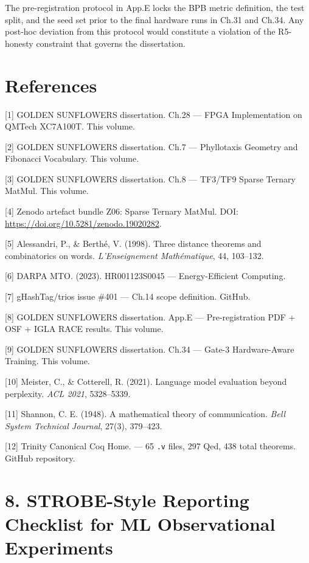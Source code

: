 The pre-registration protocol in App.E locks the
BPB metric definition, the test split, and the
seed set prior to the final hardware runs in Ch.31
and Ch.34. Any post-hoc deviation from this
protocol would constitute a violation of the
R5-honesty constraint that governs the
dissertation.

\section{References}\label{fa_14:references}

[1] GOLDEN SUNFLOWERS dissertation. Ch.28 ---
FPGA Implementation on QMTech XC7A100T. This
volume.

[2] GOLDEN SUNFLOWERS dissertation. Ch.7 ---
Phyllotaxis Geometry and Fibonacci Vocabulary.
This volume.

[3] GOLDEN SUNFLOWERS dissertation. Ch.8 ---
TF3/TF9 Sparse Ternary MatMul. This volume.

[4] Zenodo artefact bundle Z06: Sparse Ternary
MatMul. DOI:
\url{https://doi.org/10.5281/zenodo.19020282}.

[5] Alessandri, P., \& Berthé, V. (1998).
Three distance theorems and combinatorics on
words. \emph{L'Enseignement Mathématique}, 44,
103--132.

[6] DARPA MTO. (2023). HR001123S0045 ---
Energy-Efficient Computing.

[7] gHashTag/trios issue \#401 --- Ch.14 scope
definition. GitHub.

[8] GOLDEN SUNFLOWERS dissertation. App.E ---
Pre-registration PDF + OSF + IGLA RACE results.
This volume.

[9] GOLDEN SUNFLOWERS dissertation. Ch.34 ---
Gate-3 Hardware-Aware Training. This volume.

[10] Meister, C., \& Cotterell, R. (2021).
Language model evaluation beyond perplexity.
\emph{ACL 2021}, 5328--5339.

[11] Shannon, C. E. (1948). A mathematical
theory of communication. \emph{Bell System
Technical Journal}, 27(3), 379--423.

[12] Trinity Canonical Coq Home.
 --- 65
\texttt{.v} files, 297 Qed, 438 total theorems.
GitHub repository.

\section{8. STROBE-Style Reporting Checklist for ML
Observational
Experiments}\label{fa_14:strobe-checklist}

